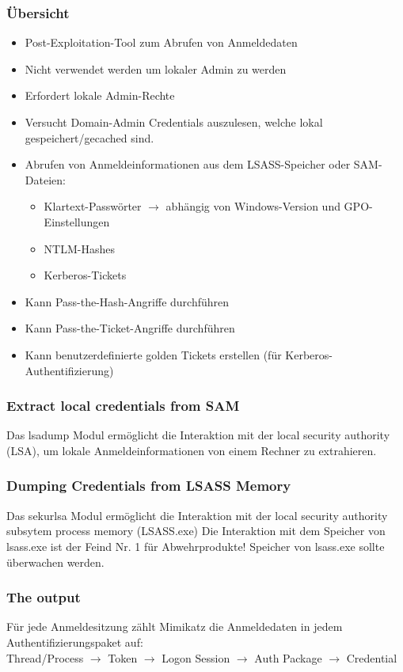 \subsubsection{Übersicht}
\begin{itemize}
    \item Post-Exploitation-Tool zum Abrufen von Anmeldedaten
    \item Nicht verwendet werden um lokaler Admin zu werden
    \item Erfordert lokale Admin-Rechte
    \item Versucht Domain-Admin Credentials auszulesen, welche lokal gespeichert/gecached sind.
    \item Abrufen von Anmeldeinformationen aus dem LSASS-Speicher oder SAM-Dateien:
    \begin{itemize}
        \item Klartext-Passwörter $\rightarrow$  abhängig von Windows-Version und GPO-Einstellungen
        \item NTLM-Hashes
        \item Kerberos-Tickets
    \end{itemize}
    \item Kann Pass-the-Hash-Angriffe durchführen
    \item Kann Pass-the-Ticket-Angriffe durchführen
    \item Kann benutzerdefinierte golden Tickets erstellen (für Kerberos-Authentifizierung)
\end{itemize}

\subsubsection{Extract local credentials from SAM}
Das lsadump Modul ermöglicht die Interaktion mit der local security authority (LSA), um lokale Anmeldeinformationen von einem Rechner zu extrahieren.

\subsubsection{Dumping Credentials from LSASS Memory}
Das sekurlsa Modul ermöglicht die Interaktion mit der local security authority subsytem process memory (LSASS.exe)
Die Interaktion mit dem Speicher von lsass.exe ist der Feind Nr. 1 für Abwehrprodukte! Speicher von lsass.exe sollte überwachen werden.

\subsubsection{The output}
Für jede Anmeldesitzung zählt Mimikatz die Anmeldedaten in jedem Authentifizierungspaket auf:\\
Thread/Process $\rightarrow$ Token $\rightarrow$ Logon Session $\rightarrow$ Auth Package $\rightarrow$ Credential

